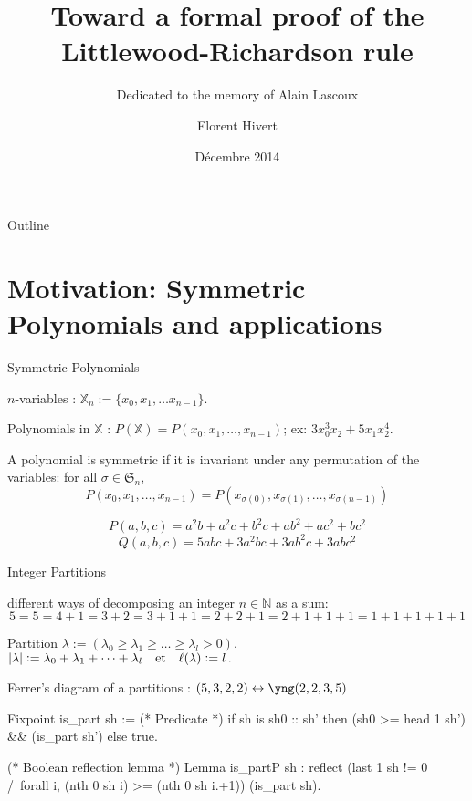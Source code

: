 \documentclass[compress,11pt]{beamer}
\title{\bf\LARGE Toward a formal proof of the \\
Littlewood-Richardson rule\\[5mm]}
\subtitle{Dedicated to the memory of Alain Lascoux}
\author{Florent Hivert}
\institute[LRI]{
  LRI / Université Paris Sud 11 / CNRS}
\date[Décembre 2014]{Décembre 2014}
\newcommand{\XX}{{\mathbb X}}
\newcommand{\N}{{\mathbb N}}
\newcommand{\SG}{{\mathfrak S}}
\newcommand{\qandq}{\text{\quad et\quad}}
\renewcommand{\emph}[1]{{\color{red} #1}}
\begin{document}
\frame{\titlepage}

\begin{frame}{Outline}

  \tableofcontents
\end{frame}
\section{Motivation: Symmetric Polynomials and applications}
\begin{frame}{Symmetric Polynomials}
  
  $n$-variables : $\XX_n := \{x_0, x_1, \dots x_{n-1}\}$.

  Polynomials in $\XX$ : $P(\XX) = P(x_0, x_1, \dots, x_{n-1})$; ex: $3x_0^3x_2
  + 5 x_1x_2^4$.

  \begin{DEFN}
    A polynomial is \emph{symmetric} if it is invariant under any permutation of the
    variables: for all $\sigma\in\SG_n$,
    \[P(x_0, x_1, \dots, x_{n-1}) = 
    P(x_{\sigma(0)}, x_{\sigma(1)}, \dots, x_{\sigma({n-1})})\]
  \end{DEFN}

  \[P(a,b,c) = a^2b + a^2c + b^2c + ab^2 + ac^2 + bc^2\]
  \[Q(a,b,c) = 5abc + 3a^2bc + 3ab^2c + 3abc^2\]

\end{frame}

\begin{frame}[fragile]{Integer Partitions}

  different ways of decomposing an integer $n\in\N$ as a sum:
  \[ 5=5=4+1=3+2=3+1+1=2+2+1=2+1+1+1=1+1+1+1+1 \]

  Partition $\lambda := (\lambda_0\geq\lambda_1\geq\dots\geq\lambda_l > 0)$.\\
  $|\lambda| := \lambda_0+\lambda_1+\dots+\lambda_l \qandq
  \ell(\lambda) := l\,. $

  Ferrer's diagram of a partitions : $(5,3,2,2) \leftrightarrow \yng(2,2,3,5)$



\begin{coqcode}
  Fixpoint is_part sh := (* Predicate *)
    if sh is sh0 :: sh'
    then (sh0 >= head 1 sh') && (is_part sh')
    else true.

  (* Boolean reflection lemma *)
  Lemma is_partP sh : reflect
    (last 1 sh != 0 /\ forall i, (nth 0 sh i) >= (nth 0 sh i.+1))
    (is_part sh).
\end{coqcode}

\end{frame}
\end{document}
